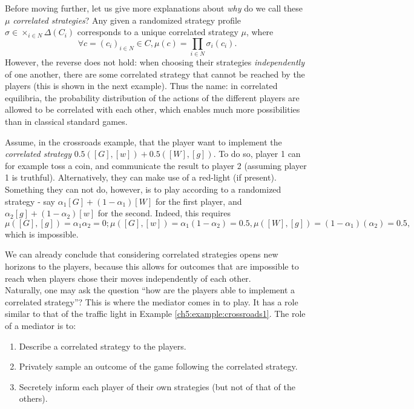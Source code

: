 Before moving further, let us give more explanations about \emph{why} do we call these $\mu$ \emph{correlated strategies}?
Any given a randomized strategy profile $\sigma \in \times_{i \in N} \Delta(C_i)$ corresponds to a unique correlated strategy $\mu$, where
$$\forall c = (c_i)_{i \in N} \in C, \mu(c) = \prod_{i \in N} \sigma_i(c_i). $$
However, the reverse does not hold: when choosing their strategies \emph{independently} of one another,  there are some correlated strategy that cannot be reached by the players (this is shown in the next example). Thus the name: in correlated equilibria, the probability distribution of the actions of the different players are allowed to be correlated with each other, which enables much more possibilities than in classical standard games.

\begin{example}
Assume, in the crossroads example, that the player want to implement the \emph{correlated strategy} $0.5([G], [w]) + 0.5 ([W], [g])$. To do so, player 1 can for example toss a coin, and communicate the result to player 2 (assuming player 1 is truthful).  Alternatively, they can make use of a red-light (if present).\\
Something they can not do, however, is to play according to a randomized strategy - say $\alpha_1[G] + (1-\alpha_1)[W]$ for the first player, and $\alpha_2[g] + (1-\alpha_2)[w]$ for the second.
Indeed, this requires
$$ \mu([G], [g]) = \alpha_1 \alpha_2 = 0; \mu([G], [w]) = \alpha_1 (1-\alpha_2) = 0.5, \mu([W], [g]) = (1-\alpha_1) (\alpha_2) = 0.5, $$
which is impossible.
\end{example}
We can already conclude that considering correlated strategies opens new horizons to the players, because this allows for outcomes that are impossible to reach when players chose their moves independently of each other.\\

Naturally, one may ask the question ``how are the players able to implement a correlated strategy''?
This is where the mediator comes in to play. It has a role similar to that of the traffic light in Example \ref{ch5:example:crossroads1}.
The role of a mediator is to:
\begin{enumerate}
\item{Describe a correlated strategy to the players. }
\item{Privately sample an outcome of the game following the correlated strategy. }
\item{Secretely inform each player of their own strategies (but not of that of the others).}
\end{enumerate}









